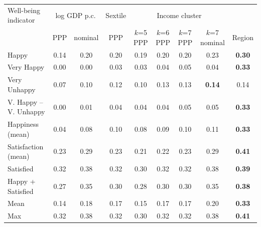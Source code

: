 \begin{tabular}{lcccccccc}
\toprule
Well-being indicator & \multicolumn{2}{c}{log GDP p.c.} & Sextile & \multicolumn{4}{c}{Income cluster} \\ & PPP & nominal & PPP & $k$=5 PPP & $k$=6 PPP & $k$=7 PPP & $k$=7 nominal & Region \\
\midrule
Happy & 0.14 & 0.20 & 0.20 & 0.19 & 0.20 & 0.20 & 0.23 & \textbf{0.30} \\
Very Happy & 0.00 & 0.00 & 0.03 & 0.03 & 0.04 & 0.05 & 0.04 & \textbf{0.33} \\
Very Unhappy & 0.07 & 0.10 & 0.12 & 0.10 & 0.13 & 0.13 & \textbf{0.14} & 0.14 \\
V. Happy -- V. Unhappy & 0.00 & 0.01 & 0.04 & 0.04 & 0.04 & 0.05 & 0.05 & \textbf{0.33} \\
Happiness (mean) & 0.04 & 0.08 & 0.10 & 0.08 & 0.09 & 0.10 & 0.11 & \textbf{0.33} \\
Satisfaction (mean) & 0.23 & 0.29 & 0.23 & 0.21 & 0.22 & 0.23 & 0.29 & \textbf{0.41} \\
Satisfied & 0.32 & 0.38 & 0.32 & 0.30 & 0.32 & 0.32 & 0.38 & \textbf{0.39} \\
Happy + Satisfied & 0.27 & 0.35 & 0.30 & 0.28 & 0.30 & 0.30 & 0.35 & \textbf{0.38} \\
\midrule
Mean & 0.14 & 0.18 & 0.17 & 0.15 & 0.17 & 0.17 & 0.20 & \textbf{0.33} \\
Max & 0.32 & 0.38 & 0.32 & 0.30 & 0.32 & 0.32 & 0.38 & \textbf{0.41} \\
\bottomrule
\end{tabular}
